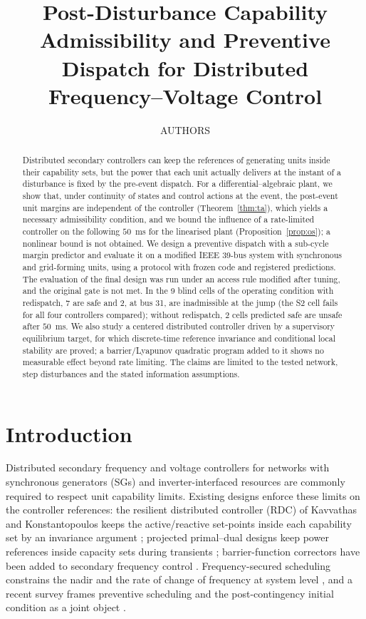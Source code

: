 \documentclass[11pt,twocolumn]{article}
\title{Post-Disturbance Capability Admissibility and Preventive Dispatch for Distributed Frequency--Voltage Control}
\author{AUTHORS}
\begin{document}
\sloppy
\maketitle

\begin{abstract}
Distributed secondary controllers can keep the references of generating units inside their capability sets, but the power that each unit actually delivers at the instant of a disturbance is fixed by the pre-event dispatch. For a differential--algebraic plant, we show that, under continuity of states and control actions at the event, the post-event unit margins are independent of the controller (Theorem~\ref{thm:ta}), which yields a necessary admissibility condition, and we bound the influence of a rate-limited controller on the following $50$~ms for the linearised plant (Proposition~\ref{prop:os}); a nonlinear bound is not obtained. We design a preventive dispatch with a sub-cycle margin predictor and evaluate it on a modified IEEE 39-bus system with synchronous and grid-forming units, using a protocol with frozen code and registered predictions. The evaluation of the final design was run under an access rule modified after tuning, and the original gate is not met. In the 9 blind cells of the operating condition with redispatch, 7 are safe and 2, at bus 31, are inadmissible at the jump (the S2 cell fails for all four controllers compared); without redispatch, 2 cells predicted safe are unsafe after $50$~ms. We also study a centered distributed controller driven by a supervisory equilibrium target, for which discrete-time reference invariance and conditional local stability are proved; a barrier/Lyapunov quadratic program added to it shows no measurable effect beyond rate limiting. The claims are limited to the tested network, step disturbances and the stated information assumptions.
\end{abstract}

\section{Introduction}
\label{sec:intro}
Distributed secondary frequency and voltage controllers for networks with synchronous generators (SGs) and inverter-interfaced resources are commonly required to respect unit capability limits. Existing designs enforce these limits on the controller references: the resilient distributed controller (RDC) of Kavvathas and Konstantopoulos keeps the active/reactive set-points inside each capability set by an invariance argument \cite{Kavvathas2025Resilient,Kavvathas2023MED}; projected primal--dual designs keep power references inside capacity sets during transients \cite{Wang2026Distributed,Mo2026MultiSlot}; barrier-function correctors have been added to secondary frequency control \cite{MoLiu2025Transient,Tang2026SafeFrequency}. Frequency-secured scheduling constrains the nadir and the rate of change of frequency at system level \cite{Paturet2020Stochastic}, and a recent survey frames preventive scheduling and the post-contingency initial condition as a joint object \cite{She2026Security}.
\end{document}
